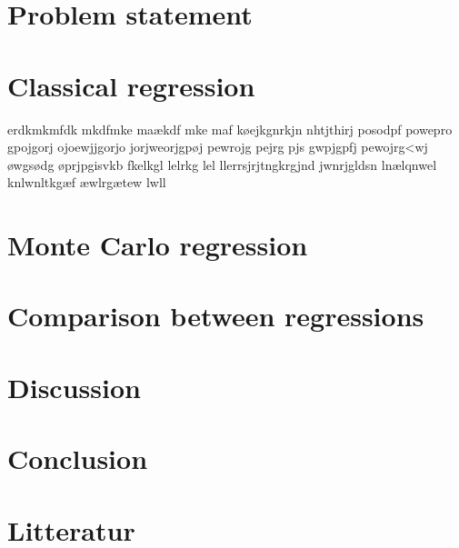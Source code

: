 \documentclass{article}
\begin{document}
	\section{Problem statement}
	\newpage
	\section{Classical regression}
 	erdkmkmfdk mkdfmke maækdf mke maf  køejkgnrkjn nhtjthirj posodpf powepro gpojgorj ojoewjjgorjo jorjweorjgpøj pewrojg pejrg pjs gwpjgpfj pewojrg<wj  øwgsødg øprjpgisvkb fkelkgl lelrkg lel   llerrsjrjtngkrgjnd jwnrjgldsn  lnælqnwel knlwnltkgæf æwlrgætew lwll
	\newpage
	\section{Monte Carlo regression}
	\newpage
	\section{Comparison between regressions}
	\newpage
	\section{Discussion}
	\newpage
	\section{Conclusion}
	\newpage
 	\section{Litteratur}
  
\end{document}
